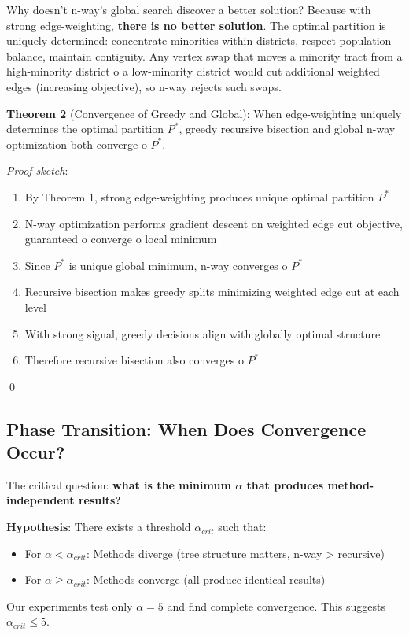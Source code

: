 Why doesn't n-way's global search discover a better solution? Because with strong edge-weighting, \textbf{there is no better solution}. The optimal partition is uniquely determined: concentrate minorities within districts, respect population balance, maintain contiguity. Any vertex swap that moves a minority tract from a high-minority district 	o a low-minority district would cut additional weighted edges (increasing objective), so n-way rejects such swaps.

\textbf{Theorem 2} (Convergence of Greedy and Global): When edge-weighting uniquely determines the optimal partition $P^*$, greedy recursive bisection and global n-way optimization both converge 	o $P^*$.

\textit{Proof sketch}:
\begin{enumerate}
\item By Theorem 1, strong edge-weighting produces unique optimal partition $P^*$
\item N-way optimization performs gradient descent on weighted edge cut objective, guaranteed 	o converge 	o local minimum
\item Since $P^*$ is unique global minimum, n-way converges 	o $P^*$
\item Recursive bisection makes greedy splits minimizing weighted edge cut at each level
\item With strong signal, greedy decisions align with globally optimal structure
\item Therefore recursive bisection also converges 	o $P^*$
\end{enumerate}
\qed

\subsection{Phase Transition: When Does Convergence Occur?}

The critical question: \textbf{what is the minimum $\alpha$ that produces method-independent results?}

\textbf{Hypothesis}: There exists a threshold $\alpha_{crit}$ such that:
\begin{itemize}
\item For $\alpha < \alpha_{crit}$: Methods diverge (tree structure matters, n-way > recursive)
\item For $\alpha \geq \alpha_{crit}$: Methods converge (all produce identical results)
\end{itemize}

Our experiments test only $\alpha = 5$ and find complete convergence. This suggests $\alpha_{crit} \leq 5$.


